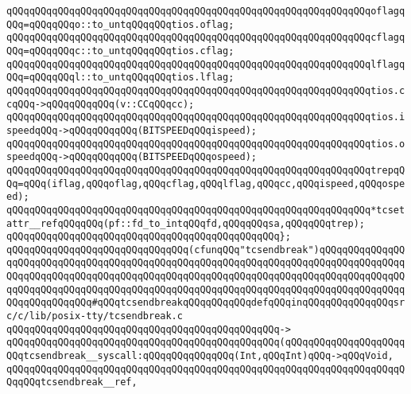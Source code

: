 \verb|qQQqqQQqqQQqqQQqqQQqqQQqqQQqqQQqqQQqqQQqqQQqqQQqqQQqqQQqqQQqqQQqoflagqQQq=qQQqqQQqo::to_untqQQqqQQqtios.oflag;|\newline
\verb|qQQqqQQqqQQqqQQqqQQqqQQqqQQqqQQqqQQqqQQqqQQqqQQqqQQqqQQqqQQqqQQqcflagqQQq=qQQqqQQqc::to_untqQQqqQQqtios.cflag;|\newline
\verb|qQQqqQQqqQQqqQQqqQQqqQQqqQQqqQQqqQQqqQQqqQQqqQQqqQQqqQQqqQQqqQQqlflagqQQq=qQQqqQQql::to_untqQQqqQQqtios.lflag;|\newline
\newline
\verb|qQQqqQQqqQQqqQQqqQQqqQQqqQQqqQQqqQQqqQQqqQQqqQQqqQQqqQQqqQQqqQQqtios.ccqQQq->qQQqqQQqqQQq(v::CCqQQqcc);|\newline
\newline
\verb|qQQqqQQqqQQqqQQqqQQqqQQqqQQqqQQqqQQqqQQqqQQqqQQqqQQqqQQqqQQqqQQqtios.ispeedqQQq->qQQqqQQqqQQq(BITSPEEDqQQqispeed);|\newline
\verb|qQQqqQQqqQQqqQQqqQQqqQQqqQQqqQQqqQQqqQQqqQQqqQQqqQQqqQQqqQQqqQQqtios.ospeedqQQq->qQQqqQQqqQQq(BITSPEEDqQQqospeed);|\newline
\newline
\verb|qQQqqQQqqQQqqQQqqQQqqQQqqQQqqQQqqQQqqQQqqQQqqQQqqQQqqQQqqQQqqQQqtrepqQQq=qQQq(iflag,qQQqoflag,qQQqcflag,qQQqlflag,qQQqcc,qQQqispeed,qQQqospeed);|\newline
\newline
\verb|qQQqqQQqqQQqqQQqqQQqqQQqqQQqqQQqqQQqqQQqqQQqqQQqqQQqqQQqqQQqqQQq*tcsetattr__refqQQqqQQq(pf::fd_to_intqQQqfd,qQQqqQQqsa,qQQqqQQqtrep);|\newline
\verb|qQQqqQQqqQQqqQQqqQQqqQQqqQQqqQQqqQQqqQQqqQQqqQQq};|\newline
\newline
\newline
\verb|qQQqqQQqqQQqqQQqqQQqqQQqqQQqqQQq(cfunqQQq"tcsendbreak")qQQqqQQqqQQqqQQqqQQqqQQqqQQqqQQqqQQqqQQqqQQqqQQqqQQqqQQqqQQqqQQqqQQqqQQqqQQqqQQqqQQqqQQqqQQqqQQqqQQqqQQqqQQqqQQqqQQqqQQqqQQqqQQqqQQqqQQqqQQqqQQqqQQqqQQqqQQqqQQqqQQqqQQqqQQqqQQqqQQqqQQqqQQqqQQqqQQqqQQqqQQqqQQqqQQqqQQqqQQqqQQqqQQqqQQqqQQqqQQq#qQQqtcsendbreakqQQqqQQqqQQqdefqQQqinqQQqqQQqqQQqqQQqsrc/c/lib/posix-tty/tcsendbreak.c|\newline
\verb|qQQqqQQqqQQqqQQqqQQqqQQqqQQqqQQqqQQqqQQqqQQqqQQq->|\newline
\verb|qQQqqQQqqQQqqQQqqQQqqQQqqQQqqQQqqQQqqQQqqQQqqQQq(qQQqqQQqqQQqqQQqqQQqqQQqtcsendbreak__syscall:qQQqqQQqqQQqqQQq(Int,qQQqInt)qQQq->qQQqVoid,|\newline
\verb|qQQqqQQqqQQqqQQqqQQqqQQqqQQqqQQqqQQqqQQqqQQqqQQqqQQqqQQqqQQqqQQqqQQqqQQqqQQqtcsendbreak__ref,|\newline

